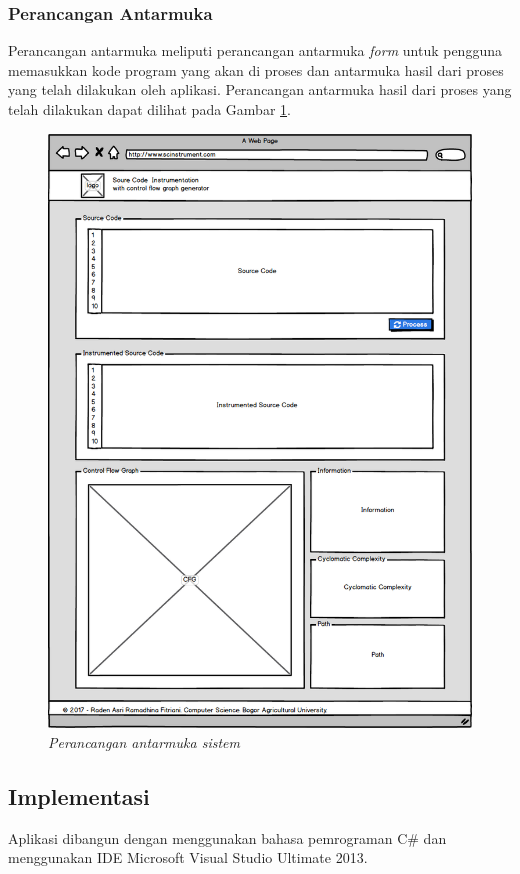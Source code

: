 \subsubsection*{Perancangan Antarmuka}
Perancangan antarmuka meliputi perancangan antarmuka \textit{form} untuk pengguna memasukkan kode program yang akan di proses dan antarmuka hasil dari proses yang telah dilakukan oleh aplikasi. Perancangan antarmuka hasil dari proses yang telah dilakukan dapat dilihat pada Gambar \ref{fig:perancanganantarmuka}.
\begin{figure}[h!]
	\centering
	\includegraphics[width=0.9\linewidth]{gambar/perancanganantarmuka}
	\caption{\textit{Perancangan antarmuka sistem}}
	\label{fig:perancanganantarmuka}
\end{figure}

\subsection*{Implementasi}

Aplikasi dibangun dengan menggunakan bahasa pemrograman C\# dan menggunakan IDE Microsoft Visual Studio Ultimate 2013. 

